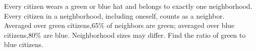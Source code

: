 Every citizen wears a green or blue hat and belongs to exactly one neighborhood. Every citizen in a neighborhood, including oneself, counts as a neighbor. Averaged over green citizens,65\% of neighbors are green; averaged over blue citizens,80\% are blue. Neighborhood sizes may differ. Find the ratio of green to blue citizens.
